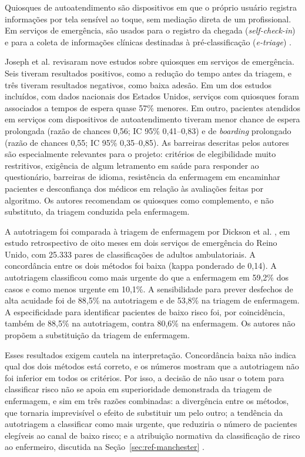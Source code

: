 
Quiosques de autoatendimento são dispositivos em que o próprio usuário registra informações por tela sensível ao toque, sem mediação direta de um profissional. Em serviços de emergência, são usados para o registro da chegada (\textit{self-check-in}) e para a coleta de informações clínicas destinadas à pré-classificação (\textit{e-triage}) \cite{joseph2023}.

Joseph et al. \cite{joseph2023} revisaram nove estudos sobre quiosques em serviços de emergência. Seis tiveram resultados positivos, como a redução do tempo antes da triagem, e três tiveram resultados negativos, como baixa adesão. Em um dos estudos incluídos, com dados nacionais dos Estados Unidos, serviços com quiosques foram associados a tempos de espera quase 57\% menores. Em outro, pacientes atendidos em serviços com dispositivos de autoatendimento tiveram menor chance de espera prolongada (razão de chances 0,56; IC 95\% 0,41--0,83) e de \textit{boarding} prolongado (razão de chances 0,55; IC 95\% 0,35--0,85). As barreiras descritas pelos autores são especialmente relevantes para o projeto: critérios de elegibilidade muito restritivos, exigência de algum letramento em saúde para responder ao questionário, barreiras de idioma, resistência da enfermagem em encaminhar pacientes e desconfiança dos médicos em relação às avaliações feitas por algoritmo. Os autores recomendam os quiosques como complemento, e não substituto, da triagem conduzida pela enfermagem.

A autotriagem foi comparada à triagem de enfermagem por Dickson et al. \cite{dickson2022}, em estudo retrospectivo de oito meses em dois serviços de emergência do Reino Unido, com 25.333 pares de classificações de adultos ambulatoriais. A concordância entre os dois métodos foi baixa (kappa ponderado de 0,14). A autotriagem classificou como mais urgente do que a enfermagem em 59,2\% dos casos e como menos urgente em 10,1\%. A sensibilidade para prever desfechos de alta acuidade foi de 88,5\% na autotriagem e de 53,8\% na triagem de enfermagem. A especificidade para identificar pacientes de baixo risco foi, por coincidência, também de 88,5\% na autotriagem, contra 80,6\% na enfermagem. Os autores não propõem a substituição da triagem de enfermagem.

Esses resultados exigem cautela na interpretação. Concordância baixa não indica qual dos dois métodos está correto, e os números mostram que a autotriagem não foi inferior em todos os critérios. Por isso, a decisão de não usar o totem para classificar risco não se apoia em superioridade demonstrada da triagem de enfermagem, e sim em três razões combinadas: a divergência entre os métodos, que tornaria imprevisível o efeito de substituir um pelo outro; a tendência da autotriagem a classificar como mais urgente, que reduziria o número de pacientes elegíveis ao canal de baixo risco; e a atribuição normativa da classificação de risco ao enfermeiro, discutida na Seção~\ref{sec:ref-manchester} \cite{cofen661}.

